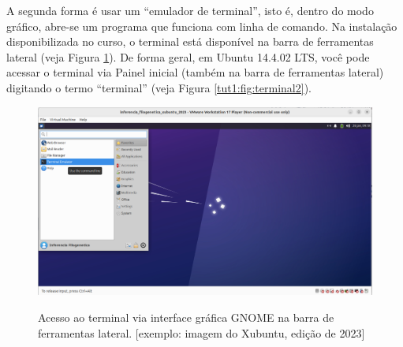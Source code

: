 \begin{refsection}

A segunda forma é usar um ``emulador de terminal'', isto é, dentro do modo gráfico, abre-se um programa que funciona com linha de comando. Na instalação disponibilizada no curso, o terminal está disponível na barra de ferramentas lateral (veja Figura \ref{tut1:fig:terminal1}). De forma geral, em Ubuntu 14.4.02 LTS, você pode acessar o terminal via Painel inicial (também na barra de ferramentas lateral) digitando o termo ``terminal'' (veja Figura \ref{tut1:fig:terminal2}).\\

  \begin{figure}[H]
       \centering
      {\includegraphics[scale=0.35]{figures/tut1/terminal1.jpg}}
      {\caption[\textit{Acesso ao terminal via interface gráfica GNOME}]{Acesso ao terminal via interface gráfica GNOME na barra de ferramentas lateral. [exemplo: imagem do Xubuntu, edição de 2023]}\label{tut1:fig:terminal1}}
  \end{figure}



\end{refsection}

